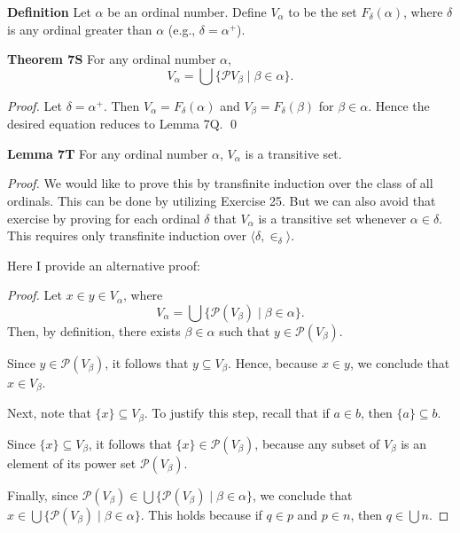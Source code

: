 \begin{leftbar}
    \medskip
    \noindent
    \textbf{Definition} Let \( \alpha \) be an ordinal number. Define \( V_\alpha \) to be the set \( F_\delta(\alpha) \), where \( \delta \) is any ordinal greater than \( \alpha \) (e.g., \( \delta = \alpha^+ \)).

    \medskip
    \noindent
    \textbf{Theorem 7S} For any ordinal number \( \alpha \),
    \[
    V_\alpha = \bigcup \{\mathscr{P} V_\beta \mid \beta \in \alpha \}.
    \]

    \medskip
    \noindent
    \textit{Proof.} Let \( \delta = \alpha^+ \). Then \( V_\alpha = F_\delta(\alpha) \) and \( V_\beta = F_\delta(\beta) \) for \( \beta \in \alpha \). Hence the desired equation reduces to Lemma 7Q. \qed

    \medskip
    \noindent
    \textbf{Lemma 7T} For any ordinal number \( \alpha \), \( V_\alpha \) is a transitive set.

    \medskip
    \noindent
    \textit{Proof.} We would like to prove this by transfinite induction over the class of all ordinals. This can be done by utilizing Exercise 25. But we can also avoid that exercise by proving for each ordinal \( \delta \) that \( V_\alpha \) is a transitive set whenever \( \alpha \in \delta \). This requires only transfinite induction over \( \langle \delta, \in_\delta \rangle \).
\end{leftbar}

Here I provide an alternative proof:
\begin{proof}
    Let \( x \in y \in V_\alpha \), where
    \[
    V_\alpha = \bigcup \{ \mathscr{P}(V_\beta) \mid \beta \in \alpha \}.
    \]
    Then, by definition, there exists \( \beta \in \alpha \) such that \( y \in \mathscr{P}(V_\beta) \). 

    \medskip

    \noindent Since \( y \in \mathscr{P}(V_\beta) \), it follows that \( y \subseteq V_\beta \). Hence, because \( x \in y \), we conclude that \( x \in V_\beta \).

    \medskip

    \noindent Next, note that \( \{x\} \subseteq V_\beta \). To justify this step, recall that if \( a \in b \), then \( \{a\} \subseteq b \).

    \medskip

    \noindent Since \( \{x\} \subseteq V_\beta \), it follows that \( \{x\} \in \mathscr{P}(V_\beta) \), because any subset of \( V_\beta \) is an element of its power set \( \mathscr{P}(V_\beta) \).

    \medskip

    \noindent Finally, since \( \mathscr{P}(V_\beta) \in \bigcup \{\mathscr{P}(V_\beta) \mid \beta \in \alpha \} \), we conclude that \( x \in \bigcup \{\mathscr{P}(V_\beta) \mid \beta \in \alpha \} \). This holds because if \( q \in p \) and \( p \in n \), then \( q \in \bigcup n \).

\end{proof}